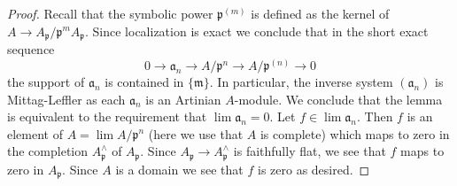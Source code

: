 \documentclass[10pt,a4paper]{amsart}
\theoremstyle{plain}
\theoremstyle{definition}
\theoremstyle{remark}
\numberwithin{equation}{subsection}
\def\lim{\mathop{\mathrm{lim}}\nolimits}
\begin{document}
\begin{proof}
Recall that the symbolic power $\mathfrak p^{(m)}$ is defined as the
kernel of $A \to A_\mathfrak p/\mathfrak p^mA_\mathfrak p$.
Since localization is exact we conclude that in the short exact sequence
$$
0 \to \mathfrak a_n \to A/\mathfrak p^n \to A/\mathfrak p^{(n)} \to 0
$$
the support of $\mathfrak a_n$ is contained in $\{\mathfrak m\}$.
In particular, the inverse system $(\mathfrak a_n)$ is Mittag-Leffler
as each $\mathfrak a_n$ is an Artinian $A$-module.
We conclude that the lemma is equivalent to the requirement
that $\lim \mathfrak a_n = 0$. Let $f \in \lim \mathfrak a_n$.
Then $f$ is an element of $A = \lim A/\mathfrak p^n$
(here we use that $A$ is complete)
which maps to zero in the completion $A_\mathfrak p^\wedge$
of $A_\mathfrak p$. Since $A_\mathfrak p \to A_\mathfrak p^\wedge$
is faithfully flat, we see that $f$ maps to zero in $A_\mathfrak p$.
Since $A$ is a domain we see that $f$ is zero as desired.
\end{proof}
\end{document}
